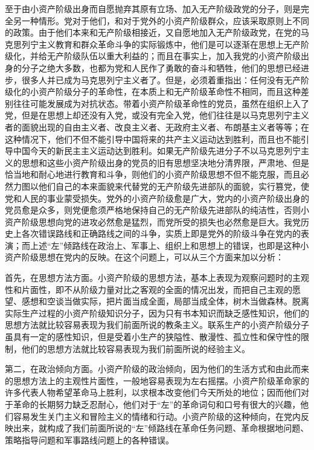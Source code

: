 至于由小资产阶级出身而自愿抛弃其原有立场、加入无产阶级政党的分子，则是完全另一种情形。党对于他们，和对于党外的小资产阶级群众，应该采取原则上不同的政策。由于他们本来和无产阶级相接近，又自愿地加入无产阶级政党，在党的马克思列宁主义教育和群众革命斗争的实际锻炼中，他们是可以逐渐在思想上无产阶级化，并给无产阶级队伍以重大利益的；而且在事实上，加入我党的小资产阶级出身的分子之绝大多数，也都为党和人民作了勇敢的奋斗和牺牲，他们的思想已经进步，很多人并已成为马克思列宁主义者了。但是，必须着重指出：任何没有无产阶级化的小资产阶级分子的革命性，在本质上和无产阶级革命性不相同，而且这种差别往往可能发展成为对抗状态。带着小资产阶级革命性的党员，虽然在组织上入了党，但是在思想上却还没有入党，或没有完全入党，他们往往是以马克思列宁主义者的面貌出现的自由主义者、改良主义者、无政府主义者、布朗基主义者等等；在这种情况下，他们不但不能引导中国将来的共产主义运动达到胜利，而且也不能引导中国今天的新民主主义运动达到胜利。如果无产阶级先进分子不以马克思列宁主义的思想和这些小资产阶级出身的党员的旧有思想坚决地分清界限，严肃地、但是恰当地和耐心地进行教育和斗争，则他们的小资产阶级思想不但不能克服，而且必然力图以他们自己的本来面貌来代替党的无产阶级先进部队的面貌，实行篡党，使党和人民的事业蒙受损失。党外的小资产阶级愈是广大，党内的小资产阶级出身的党员愈是众多，则党便愈须严格地保持自己的无产阶级先进部队的纯洁性，否则小资产阶级思想向党的进攻必然愈是猛烈，而党所受的损失也必然愈是巨大。我党历史上各次错误路线和正确路线之间的斗争，实质上即是党外的阶级斗争在党内的表演；而上述“左”倾路线在政治上、军事上、组织上和思想上的错误，也即是这种小资产阶级思想在党内的反映。在这个问题上，可以从三个方面来加以分析：

首先，在思想方法方面。小资产阶级的思想方法，基本上表现为观察问题时的主观性和片面性，即不从阶级力量对比之客观的全面的情况出发，而把自己主观的愿望、感想和空谈当做实际，把片面当成全面，局部当成全体，树木当做森林。脱离实际生产过程的小资产阶级知识分子，因为只有书本知识而缺乏感性知识，他们的思想方法就比较容易表现为我们前面所说的教条主义。联系生产的小资产阶级分子虽具有一定的感性知识，但是受着小生产的狭隘性、散漫性、孤立性和保守性的限制，他们的思想方法就比较容易表现为我们前面所说的经验主义。

第二，在政治倾向方面。小资产阶级的政治倾向，因为他们的生活方式和由此而来的思想方法上的主观性片面性，一般地容易表现为左右摇摆。小资产阶级革命家的许多代表人物希望革命马上胜利，以求根本改变他们今天所处的地位；因而他们对于革命的长期努力缺乏忍耐心，他们对于“左”的革命词句和口号有很大的兴趣，他们容易发生关门主义和冒险主义的情绪和行动。小资产阶级的这种倾向，在党内反映出来，就构成了我们前面所说的“左”倾路线在革命任务问题、革命根据地问题、策略指导问题和军事路线问题上的各种错误。

